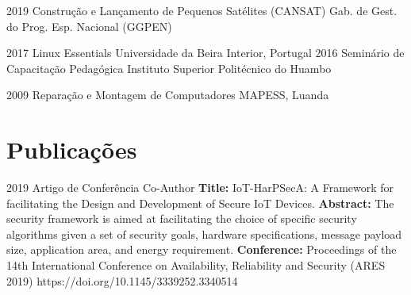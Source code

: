 \begin{entrada}

\cursos
{2019}
{Construção e Lançamento de Pequenos Satélites (CANSAT)}
{Gab. de Gest. do Prog. Esp. Nacional (GGPEN)}
{\vspace{-0.3cm}}

\cursos
{2017}
{Linux Essentials}
{Universidade da Beira Interior, Portugal}
{\vspace{-0.3cm}}
\cursos
{2016}
{Seminário de Capacitação Pedagógica}
{Instituto Superior Politécnico do Huambo}
{\vspace{-0.3cm}}

\cursos
{2009}
{Reparação e Montagem de Computadores}
{MAPESS, Luanda}
{\vspace{-0.3cm}}
\end{entrada}

\section{Publicações}

\begin{entrada}

\public
{2019}
{Artigo de Conferência}
{Co-Author}
{\textbf{Title:} IoT-HarPSecA: A Framework for facilitating the Design and Development of Secure IoT Devices.}
{\textbf{Abstract:} The security framework is aimed at facilitating the choice of specific security algorithms given a set of security goals, hardware specifications, message payload size, application area, and energy requirement.}
{\textbf{Conference:} Proceedings of the 14th International Conference on Availability, Reliability and Security (ARES 2019)}
{}{https://doi.org/10.1145/3339252.3340514}
{\vspace{-0.3cm}}
\end{entrada}

